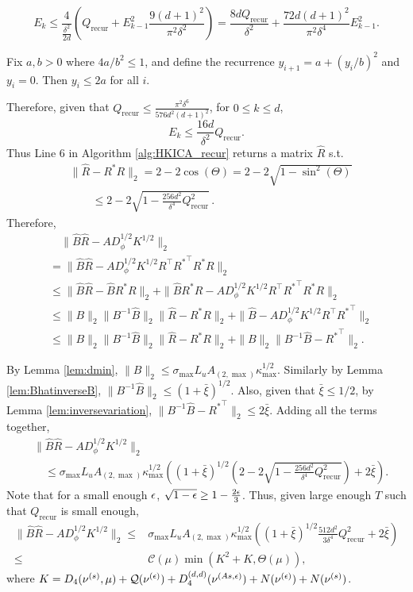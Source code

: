 \[
E_k \le \frac{4}{\frac{\delta^2}{2d}}\left(Q_{\text{recur}}+ E_{k-1}^2 \frac{9(d+1)^2}{\pi^2\delta^2}\right) = \frac{8dQ_{\text{recur}}}{\delta^2} + \frac{72d(d+1)^2 }{\pi^2\delta^4}E_{k-1}^2.
\]

\begin{prop}
	Fix $a,b>0$ where $4a/b^2 \le 1$, and define the recurrence $y_{i+1} = a + (y_i/b)^2$ and $y_i = 0$. Then $y_i \le 2a $ for all $i$.
\end{prop}
Therefore, given that $Q_{\text{recur}} \le \frac{\pi^2\delta^6}{576d^2(d+1)^2}$, for $0\le k\le d$,
\[
E_k \le \frac{16d}{\delta^2} Q_{\text{recur}}. 
\]
Thus Line 6 in Algorithm \ref{alg:HKICA_recur} returns a matrix $\hat{R}$ s.t.
\begin{align*}
& \|\hat{R} - R^*R\|_2 = 2-2\cos(\Theta)= 2 - 2\sqrt{1-\sin^2(\Theta)} \\
& \qquad \le 2 - 2\sqrt{1- \frac{256d^2}{\delta^4} Q_{\text{recur}}^2}\,.
\end{align*}
Therefore,
\begin{align*}
& \quad \| \hat{B}\hat{R} - AD_{\phi}^{1/2}K^{1/2}\|_2 \\
& = \| \hat{B}\hat{R} - AD_{\phi}^{1/2}K^{1/2}R^{\top}{R^*}^{\top}R^*R\|_2 \\
& \le \| \hat{B}\hat{R} -  \hat{B}R^*R\|_2 + \|\hat{B}R^*R - AD_{\phi}^{1/2}K^{1/2}R^{\top}{R^*}^{\top}R^*R \|_2 \\
& \le \|B\|_2\|B^{-1}\hat{B}\|_2\|\hat{R} - R^*R\|_2 + \|\hat{B} - AD_{\phi}^{1/2}K^{1/2}R^{\top}{R^*}^{\top}\|_2 \\
& \le  \|B\|_2\|B^{-1}\hat{B}\|_2\|\hat{R} - R^*R\|_2 +\|B\|_2\|B^{-1}\hat{B} - {R^*}^{\top}\|_2.
\end{align*}

By Lemma \ref{lem:dmin}, 
$ \|B\|_2 \le \sigma_{\max}L_uA_{(2,\max)}\kappa_{\max}^{1/2}$. 
Similarly by Lemma \ref{lem:BhatinverseB}, $\| B^{-1}\hat{B}\|_2 \le (1+\bar{\xi})^{1/2}$. 
Also, given that $\bar{\xi} \le 1/2$, by Lemma \ref{lem:inversevariation}, $\|B^{-1}\hat{B} -{R^*}^{\top}\|_2 \le 2\bar{\xi}$.
Adding all the terms together,
\begin{align*}
& \| \hat{B}\hat{R} - AD_{\phi}^{1/2}K^{1/2}\|_2\\
& \quad \le \sigma_{\max}L_uA_{(2,\max)}\kappa_{\max}^{1/2}\left((1+\bar{\xi})^{1/2}\left(  2 - 2\sqrt{1- \frac{256d^2}{\delta^4} Q_{\text{recur}}^2}\right) + 2\bar{\xi}\right).
\end{align*}
Note that for a small enough $\epsilon$, $\sqrt{1-\epsilon} \ge 1-\frac{2\epsilon}{3}$. Thus, given large enough $T$ such that $Q_{\text{recur}}$ is small enough,
\begin{align*}
\| \hat{B}\hat{R} - AD_{\phi}^{1/2}K^{1/2}\|_2 \le & \sigma_{\max}L_uA_{(2,\max)}\kappa_{\max}^{1/2}\left((1+\bar{\xi})^{1/2}\frac{512d^2}{3\delta^4} Q_{\text{recur}}^2+ 2\bar{\xi}\right) \\
\le & \mathcal{C}(\mu) \min\left(K^2+K, \Theta(\mu) \right),
\end{align*}
where $K = D_4(\nu^{(s)},\mu)+ \mathcal{Q}(\nu^{(\epsilon)}) + D_4^{(d,d)}(\nu^{(As,\epsilon)})
+N(\nu^{(\epsilon)}) + N( \nu^{(s)})$.

